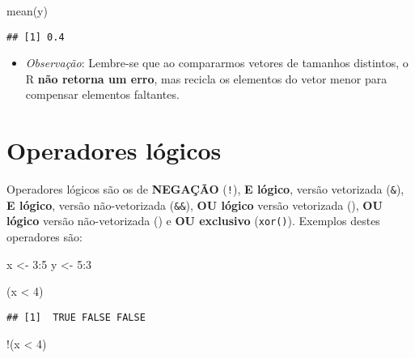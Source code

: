 \documentclass[
]{book}
\newenvironment{Shaded}{\begin{snugshade}}{\end{snugshade}}
\newcommand{\DecValTok}[1]{\textcolor[rgb]{0.00,0.00,0.81}{#1}}
\newcommand{\FunctionTok}[1]{\textcolor[rgb]{0.00,0.00,0.00}{#1}}
\newcommand{\NormalTok}[1]{#1}
\newcommand{\OtherTok}[1]{\textcolor[rgb]{0.56,0.35,0.01}{#1}}
\newcommand{\SpecialCharTok}[1]{\textcolor[rgb]{0.00,0.00,0.00}{#1}}
\providecommand{\tightlist}{%
  \setlength{\itemsep}{0pt}\setlength{\parskip}{0pt}}
\begin{document}
\begin{Shaded}
\begin{Highlighting}[]
\FunctionTok{mean}\NormalTok{(y)}
\end{Highlighting}
\end{Shaded}

\begin{verbatim}
## [1] 0.4
\end{verbatim}

\begin{itemize}
\tightlist
\item
  \emph{Observação}: Lembre-se que ao compararmos vetores de tamanhos distintos, o R \textbf{não retorna um erro}, mas recicla os elementos do vetor menor para compensar elementos faltantes.
\end{itemize}

\hypertarget{operadores-luxf3gicos}{%
\section{Operadores lógicos}\label{operadores-luxf3gicos}}

Operadores lógicos são os de \textbf{NEGAÇÃO} (\texttt{!}), \textbf{E lógico}, versão vetorizada (\texttt{\&}), \textbf{E lógico}, versão não-vetorizada (\texttt{\&\&}), \textbf{OU lógico} versão vetorizada (\texttt{\textbar{}}), \textbf{OU lógico} versão não-vetorizada (\texttt{\textbar{}\textbar{}}) e \textbf{OU exclusivo} (\texttt{xor()}). Exemplos destes operadores são:

\begin{Shaded}
\begin{Highlighting}[]
\NormalTok{x }\OtherTok{\textless{}{-}} \DecValTok{3}\SpecialCharTok{:}\DecValTok{5}
\NormalTok{y }\OtherTok{\textless{}{-}} \DecValTok{5}\SpecialCharTok{:}\DecValTok{3}
\end{Highlighting}
\end{Shaded}

\begin{Shaded}
\begin{Highlighting}[]
\NormalTok{(x }\SpecialCharTok{\textless{}} \DecValTok{4}\NormalTok{)}
\end{Highlighting}
\end{Shaded}

\begin{verbatim}
## [1]  TRUE FALSE FALSE
\end{verbatim}

\begin{Shaded}
\begin{Highlighting}[]
\SpecialCharTok{!}\NormalTok{(x }\SpecialCharTok{\textless{}} \DecValTok{4}\NormalTok{)}
\end{Highlighting}
\end{Shaded}
\end{document}
